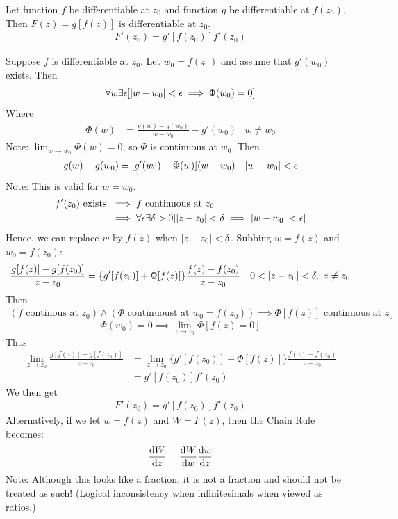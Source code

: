 \documentclass[12pt, english]{book}
\makeatletter
\renewenvironment{proof}[1][\proofname]{\par
	\pushQED{\qed}%
	\normalfont \topsep6\p@\@plus6\p@\relax
	\list{}{%
		\settowidth{\leftmargin}{\itshape\proofname:\hskip\labelsep}%
		\setlength{\labelwidth}{0pt}%
		\setlength{\itemindent}{-\leftmargin}%
		}%
	\item[\hskip\labelsep\itshape#1\@addpunct{:}]\ignorespaces
	}{\popQED\endlist\@endpefalse}
\makeatother
\begin{document}
	\begin{theorem} 
		\label{Chain Rule for Composite Functions Theorem - Complex}
		Let function $f$ be differentiable at $z_0$ and function $g$ be differentiable at \(f(z_0)\). Then \(F(z) = g[f(z)] \text{ is differentiable at } z_0\).
		\begin{align*}
			F'(z_0) = g'[f(z_0)]f'(z_0) 
		\end{align*}
	\end{theorem}
	\begin{proof}
		Suppose $f$ is differentiable at \(z_0\). Let \(w_0 = f(z_0)\) and assume that \(g'(w_0)\) exists. Then 
		\[ \forall w \exists \epsilon [\abs{w - w_0} < \epsilon \implies \Phi(w_0) = 0 ] \]
		Where 
		\begin{align*}
			\Phi(w) &= \frac{g(w) - g(w_0)}{w - w_0} - g'(w_0) & w \neq w_0
		\end{align*}
		Note: \(\lim_{w \rightarrow w_0} \Phi(w) = 0 \), so \(\Phi\) is continuous at \(w_0\).
		Then 
		\begin{align*}
			g(w) - g(w_0) &= [g'(w_0) + \Phi(w)](w - w_0)	&	 \abs{w-w_0}<\epsilon
		\end{align*}
		Note: This is valid for \(w = w_0\). 
		\begin{align*}
			f'(z_0) \text{ exists } &\implies f \text{ continuous at } z_0 \\
			&\implies \forall \epsilon \exists \delta>0 [ \abs{z - z_0} < \delta \implies \abs{w - w_0}< \epsilon]
		\end{align*}
		Hence, we can replace \(w\) by \(f(z)\) when \(\abs{z - z_0} < \delta\). Subbing \(w = f(z)\) and \(w_0 = f(z_0)\):
		\begin{align*}
			\frac{g[f(z)] - g[f(z_0)]}{z - z_0} &= \{g'[f(z_0)] + \Phi[f(z)]\} \frac{f(z) - f(z_0)}{z - z_0} 	& 0 < \abs{z-z_0} < \delta, \ z\neq z_0
		\end{align*}
		Then
		\begin{align*}
			(f \text{ continous at } z_0) \land (\Phi \text{ continuoust at } w_0 = f(z_0))
			\implies \Phi[f(z)] \text{ continuous at } z_0
		\end{align*}
		\[\Phi(w_0) = 0 \implies \lim_{z \rightarrow z_0} \Phi[f(z) = 0] \]
		Thus
		\begin{align*}
			\lim_{z \rightarrow z_0} \frac{g[f(z)] - g[f(z_0)]}{z - z_0} 
			&= \lim_{z \rightarrow z_0} \{g'[f(z_0)] + \Phi[f(z)]\} \frac{f(z) - f(z_0)}{z - z_0} \\
			&= g'[f(z_0)] f'(z_0)
		\end{align*}
		We then get
		\begin{align*}
			F'(z_0) = g'[f(z_0)]f'(z_0) 
		\end{align*}
	\end{proof}
	Alternatively, if we let \(w = f(z) \) and \(W = F(z)\), then the Chain Rule becomes:
	\[ \dv{W}{z} = \dv{W}{w} \dv{w}{z }\]
	Note: Although this looks like a fraction, it is not a fraction and should not be treated as such! (Logical inconsistency when infinitesimals when viewed as ratios.)
	
\end{document}
